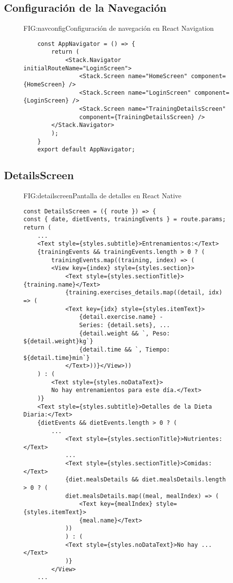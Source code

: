 \newpage

\subsection{Configuración de la Navegación}
\begin{figure}[Configuración de Navegación]{FIG:navconfig}{Configuración de navegación en React Navigation}
    \begin{verbatim}
    const AppNavigator = () => {
        return (
            <Stack.Navigator initialRouteName="LoginScreen">
                <Stack.Screen name="HomeScreen" component={HomeScreen} />
                <Stack.Screen name="LoginScreen" component={LoginScreen} />
                <Stack.Screen name="TrainingDetailsScreen" 
                component={TrainingDetailsScreen} />
        </Stack.Navigator>
        );
    }
    export default AppNavigator;
    \end{verbatim}
    \end{figure}

\newpage

\subsection{DetailsScreen}

\begin{figure}[Pantalla de Detalles]{FIG:detailscreen}{Pantalla de detalles en React Native}
    \begin{verbatim}
const DetailsScreen = ({ route }) => {
const { date, dietEvents, trainingEvents } = route.params;
return (
    ...
    <Text style={styles.subtitle}>Entrenamientos:</Text>
    {trainingEvents && trainingEvents.length > 0 ? (
        trainingEvents.map((training, index) => (
        <View key={index} style={styles.section}>
            <Text style={styles.sectionTitle}>{training.name}</Text>
            {training.exercises_details.map((detail, idx) => (
            <Text key={idx} style={styles.itemText}>
                {detail.exercise.name} - 
                Series: {detail.sets}, ...
                {detail.weight && `, Peso: ${detail.weight}kg`}
                {detail.time && `, Tiempo: ${detail.time}min`}
            </Text>))}</View>))
    ) : (
        <Text style={styles.noDataText}>
        No hay entrenamientos para este día.</Text>
    )}
    <Text style={styles.subtitle}>Detalles de la Dieta Diaria:</Text>
    {dietEvents && dietEvents.length > 0 ? (
        ...
            <Text style={styles.sectionTitle}>Nutrientes:</Text>
            ...
            <Text style={styles.sectionTitle}>Comidas:</Text>
            {diet.mealsDetails && diet.mealsDetails.length > 0 ? (
            diet.mealsDetails.map((meal, mealIndex) => (
                <Text key={mealIndex} style={styles.itemText}>
                {meal.name}</Text>
            ))
            ) : (
            <Text style={styles.noDataText}>No hay ...</Text>
            )}
        </View>
    ...
    \end{verbatim}
    \end{figure}

